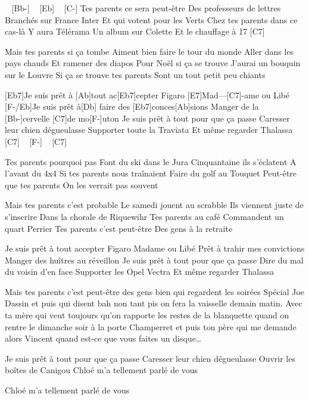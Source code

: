

\begin{guitar}
[F-] ~ [Bb-] ~ [Eb] ~ [C-] 
Tes parents ce sera peut-être
Des professeurs de lettres
Branchés sur France Inter
Et qui votent pour les Verts
Chez tes parents dans ce cas-là
Y aura Télérama
Un album sur Colette
Et le chauffage à 17 [C7]

Mais tes parents si ça tombe
Aiment bien faire le tour du monde
Aller dans les pays chauds
Et ramener des diapos
Pour Noël si ça se trouve
J’aurai un bouquin sur le Louvre
Si ça se trouve tes parents
Sont un tout petit peu chiants

[Eb7]Je suis prêt à [Ab]tout ac[Eb7]cepter
Figaro [E7]Mad---[C7]-ame ou Libé
[F-/Eb]Je suis prêt à[Db] faire des [Eb7]conces[Ab]sions
Manger de la [Bb-]cervelle [C7]de mo[F-]uton
Je suis prêt à tout pour que ça passe
Caresser leur chien dégueulasse
Supporter toute la Traviata
Et même regarder Thalassa [C7] ~ [F-] ~ [C7]

Tes parents pourquoi pas
Font du ski dans le Jura
Cinquantaine ils s’éclatent
A l’avant du 4x4
Si tes parents nous traînaient
Faire du golf au Touquet
Peut-être que tes parents
On les verrait pas souvent

Mais tes parents c’est probable
Le samedi jouent au scrabble
Ils viennent juste de s’inscrire
Dans la chorale de Riquewihr
Tes parents au café
Commandent un quart Perrier
Tes parents c’est peut-être
Des gens à la retraite

Je suis prêt à tout accepter
Figaro Madame ou Libé
Prêt à trahir mes convictions
Manger des huîtres au réveillon
Je suis prêt à tout pour que ça passe
Dire du mal du voisin d’en face
Supporter les Opel Vectra
Et même regarder Thalassa

Mais tes parents c’est peut-être des gens bien qui regardent les soirées Spécial Joe Dassin et puis qui disent bah non tant pis on fera la vaisselle demain matin.
Avec ta mère qui veut toujours qu’on rapporte les restes de la blanquette quand on rentre le dimanche soir à la porte Champerret et puis ton père qui me demande alors Vincent quand est-ce que vous faites un disque…

Je suis prêt à tout pour que ça passe
Caresser leur chien dégueulasse
Ouvrir les boîtes de Canigou
Chloé m’a tellement parlé de vous

Chloé m’a tellement parlé de vous
\end{guitar}
